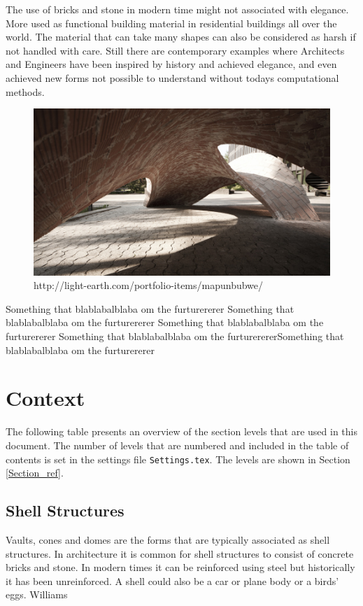 The use of bricks and stone in modern time might not associated with elegance. More used as functional building material in residential buildings all over the world. The material that can take many shapes can also be considered as harsh if not handled with care. 
Still there are contemporary examples where Architects and Engineers have been inspired by history and achieved elegance, and even achieved new forms not possible to understand without todays computational methods.

\begin{figure}[H]
\centering
\includegraphics[width=0.9\linewidth ]{figure/Introduction/BlockVault.jpg}
\caption{http://light-earth.com/portfolio-items/mapunbubwe/}
\end{figure}

Something that blablabalblaba om the furturererer
Something that blablabalblaba om the furturererer
Something that blablabalblaba om the furturererer
Something that blablabalblaba om the furturerererSomething that blablabalblaba om the furturererer


\section{Context}
The following table presents an overview of the section levels that are used in this document. The number of levels that are numbered and included in the table of contents is set in the settings file \texttt{Settings.tex}. The levels are shown in Section \ref{Section_ref}.

\subsection{Shell Structures}

Vaults, cones and domes are the forms that are typically associated as shell structures. In architecture it is common for shell structures to consist of concrete bricks and stone. In modern times it can be reinforced using steel but historically it has been unreinforced. A shell could also be a car or plane body or a birds' eggs. Williams \\

